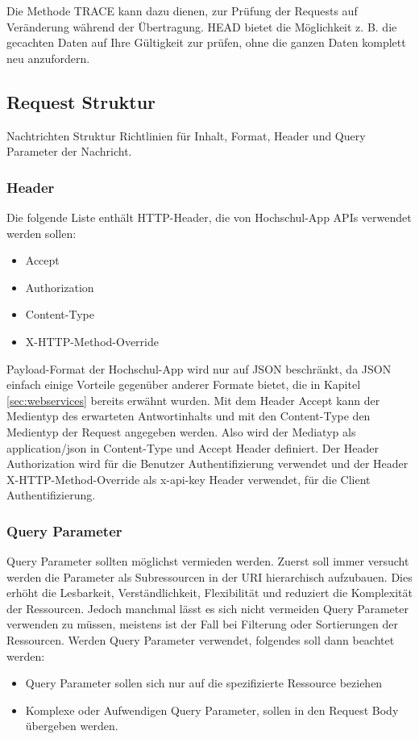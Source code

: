 Die Methode TRACE kann dazu dienen, zur Prüfung der Requests auf Veränderung während der Übertragung. HEAD bietet die Möglichkeit z. B. die gecachten Daten auf Ihre Gültigkeit zur prüfen, ohne die ganzen Daten komplett neu anzufordern.

\subsection{Request Struktur}
\label{sec:reqstructure}
Nachtrichten Struktur Richtlinien für Inhalt, Format, Header und Query Parameter der Nachricht.

\subsubsection{Header}
Die folgende Liste enthält HTTP-Header, die von Hochschul-App APIs verwendet werden sollen:
\begin{itemize}
\item Accept
\item Authorization
\item Content-Type
\item X-HTTP-Method-Override
\end{itemize}
Payload-Format der Hochschul-App wird nur auf JSON beschränkt, da JSON einfach einige Vorteile gegenüber anderer Formate bietet, die in Kapitel \ref{sec:webservices} bereits erwähnt wurden. Mit dem Header Accept kann der Medientyp des erwarteten Antwortinhalts und mit den Content-Type den Medientyp der Request angegeben werden. Also wird der Mediatyp als \glqq application/json\grqq{} in Content-Type und Accept Header definiert. Der Header Authorization wird für die Benutzer Authentifizierung verwendet und der Header X-HTTP-Method-Override als x-api-key Header verwendet, für die Client Authentifizierung.

\subsubsection{Query Parameter}
Query Parameter sollten möglichst vermieden werden. Zuerst soll immer versucht werden die Parameter als Subressourcen in der URI hierarchisch aufzubauen. Dies erhöht die Lesbarkeit, Verständlichkeit, Flexibilität und reduziert die Komplexität der Ressourcen. Jedoch manchmal lässt es sich nicht vermeiden Query Parameter verwenden zu müssen, meistens ist der Fall bei Filterung oder Sortierungen der Ressourcen. Werden Query Parameter verwendet, folgendes soll dann beachtet werden:
\begin{itemize}
\item Query Parameter sollen sich nur auf die spezifizierte Ressource beziehen
\item Komplexe oder Aufwendigen Query Parameter, sollen in den Request Body übergeben werden.
\end{itemize}

